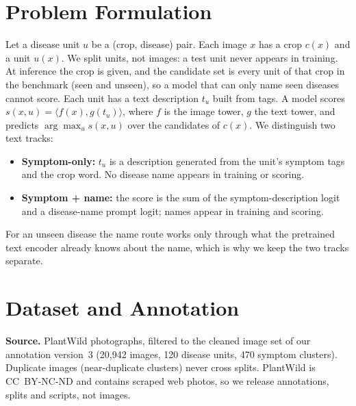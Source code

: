 \documentclass[11pt]{article}
\begin{document}
\section{Problem Formulation}
Let a disease unit $u$ be a (crop, disease) pair. Each image $x$ has a crop $c(x)$ and a unit $u(x)$. We split units, not images: a test unit never appears in training. At inference the crop is given, and the candidate set is every unit of that crop in the benchmark (seen and unseen), so a model that can only name seen diseases cannot score. Each unit has a text description $t_u$ built from tags. A model scores $s(x,u)=\langle f(x),g(t_u)\rangle$, where $f$ is the image tower, $g$ the text tower, and predicts $\arg\max_u s(x,u)$ over the candidates of $c(x)$. We distinguish two text tracks:
\begin{itemize}
\item \textbf{Symptom-only:} $t_u$ is a description generated from the unit's symptom tags and the crop word. No disease name appears in training or scoring.
\item \textbf{Symptom + name:} the score is the sum of the symptom-description logit and a disease-name prompt logit; names appear in training and scoring.
\end{itemize}
For an unseen disease the name route works only through what the pretrained text encoder already knows about the name, which is why we keep the two tracks separate.

\section{Dataset and Annotation}\label{sec:data}
\textbf{Source.} PlantWild \cite{mvpdr} photographs, filtered to the cleaned image set of our annotation version~3 (20{,}942 images, 120 disease units, 470 symptom clusters). Duplicate images (near-duplicate clusters) never cross splits. PlantWild is CC~BY-NC-ND and contains scraped web photos, so we release annotations, splits and scripts, not images.
\end{document}
